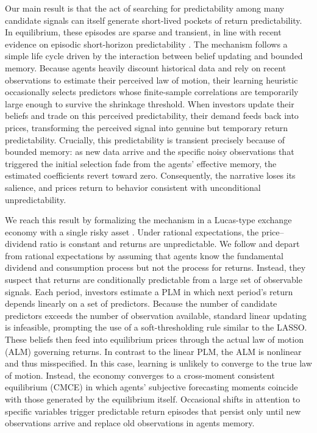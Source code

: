 Our main result is that the act of searching for predictability among many candidate signals can itself generate short-lived pockets of return predictability.
In equilibrium, these episodes are sparse and transient, in line with recent evidence on episodic short-horizon predictability \citep{Chinco2019, Farmer2023}.
The mechanism follows a simple life cycle driven by the interaction between belief updating and bounded memory.
Because agents heavily discount historical data and rely on recent observations to estimate their perceived law of motion, their learning heuristic occasionally selects predictors whose finite-sample correlations are temporarily large enough to survive the shrinkage threshold.
When investors update their beliefs and trade on this perceived predictability, their demand feeds back into prices, transforming the perceived signal into genuine but temporary return predictability.
Crucially, this predictability is transient precisely because of bounded memory: as new data arrive and the specific noisy observations that triggered the initial selection fade from the agents' effective memory, the estimated coefficients revert toward zero.
Consequently, the narrative loses its salience, and prices return to behavior consistent with unconditional unpredictability.

We reach this result by formalizing the mechanism in a Lucas-type exchange economy with a single risky asset \citep{Lucas1978}.
Under rational expectations, the price–dividend ratio is constant and returns are unpredictable.
We follow \citet{Adam2016} and depart from rational expectations by assuming that agents know the fundamental dividend and consumption process but not the process for returns.
Instead, they suspect that returns are conditionally predictable from a large set of observable signals.
Each period, investors estimate a PLM in which next period's return depends linearly on a set of predictors.
Because the number of candidate predictors exceeds the number of observation available, standard linear updating is infeasible, prompting the use of a soft-thresholding rule similar to the LASSO.
These beliefs then feed into equilibrium prices through the actual law of motion (ALM) governing returns.
In contrast to the linear PLM, the ALM is nonlinear and thus misspecified.
In this case, learning is unlikely to converge to the true law of motion.
Instead, the economy converges to a cross-moment consistent equilibrium (CMCE) in which agents' subjective forecasting moments coincide with those generated by the equilibrium itself.
Occasional shifts in attention to specific variables trigger predictable return episodes that persist only until new observations arrive and replace old observations in agents memory.

